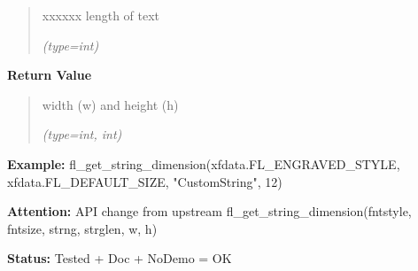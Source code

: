 \begin{boxedminipage}{\funcwidth}
\begin{quote}
\begin{Ventry}{xxxxxx}
          length of text

            {\it (type=int)}

        \end{Ventry}

      \end{quote}

      \textbf{Return Value}
    \vspace{-1ex}

      \begin{quote}
      width (w) and height (h)

      {\it (type=int, int)}

      \end{quote}

\textbf{Example:} fl\_get\_string\_dimension(xfdata.FL\_ENGRAVED\_STYLE, 
xfdata.FL\_DEFAULT\_SIZE, "CustomString", 12)



\textbf{Attention:} API change from upstream fl\_get\_string\_dimension(fntstyle, fntsize, 
strng, strglen, w, h)



\textbf{Status:} Tested + Doc + NoDemo = OK



    \end{boxedminipage}

    \label{xformslib:flbasic:fl_get_align_xy}

    \vspace{0.5ex}

